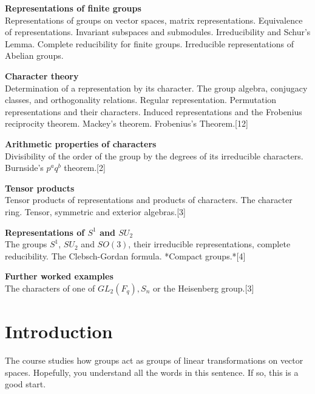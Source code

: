 \documentclass[a4paper]{article}
\begin{document}
\maketitle
{\small
\noindent\textbf{Representations of finite groups}\\
Representations of groups on vector spaces, matrix representations. Equivalence of representations. Invariant subspaces and submodules. Irreducibility and Schur's Lemma. Complete reducibility for finite groups. Irreducible representations of Abelian groups.

\vspace{10pt}
\noindent\textbf{Character theory}\\
Determination of a representation by its character. The group algebra, conjugacy classes, and orthogonality relations. Regular representation. Permutation representations and their characters. Induced representations and the Frobenius reciprocity theorem. Mackey's theorem. Frobenius's Theorem.\hspace*{\fill}[12]

\vspace{10pt}
\noindent\textbf{Arithmetic properties of characters}\\
Divisibility of the order of the group by the degrees of its irreducible characters. Burnside's $p^a q^b$ theorem.\hspace*{\fill}[2]

\vspace{10pt}
\noindent\textbf{Tensor products}\\
Tensor products of representations and products of characters. The character ring. Tensor, symmetric and exterior algebras.\hspace*{\fill}[3]

\vspace{10pt}
\noindent\textbf{Representations of $S^1$ and $SU_2$}\\
The groups $S^1$, $SU_2$ and $SO(3)$, their irreducible representations, complete reducibility. The Clebsch-Gordan formula. *Compact groups.*\hspace*{\fill}[4]

\vspace{10pt}
\noindent\textbf{Further worked examples}\\
The characters of one of $GL_2(F_q), S_n$ or the Heisenberg group.\hspace*{\fill}[3]}

\tableofcontents
\setcounter{section}{-1}
\section{Introduction}
The course studies how groups act as groups of linear transformations on vector spaces. Hopefully, you understand all the words in this sentence. If so, this is a good start.
\end{document}
